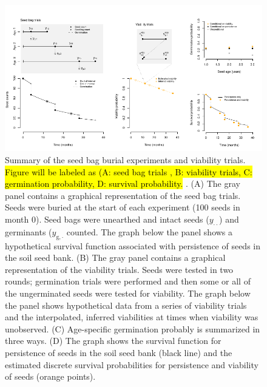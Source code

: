 \documentclass[12pt, oneside, titlepage]{article}   	%
\begin{document}
 \begin{figure}[!h]
   \centering
       \includegraphics[page=1,width=1\textwidth]{../../manuscript/figures/seed-bag-figure.pdf}  
    \caption{ Summary of the seed bag burial experiments and viability trials. \hl{Figure will be labeled as (A: seed bag trials , B: viability trials, C: germination probability, D: survival probability. }. (A) The gray panel contains a graphical representation of the seed bag trials. Seeds were buried at the start of each experiment (100 seeds in month 0). Seed bags were unearthed and intact seeds ($y_{\cdot \cdot}$) and germinants ($y_{\mathrm{g},\cdot}$ counted. The graph below the panel shows a hypothetical survival function associated with persistence of seeds in the soil seed bank. (B) The gray panel contains a graphical representation of the viability trials. Seeds were tested in two rounds; germination trials were performed and then some or all of the ungerminated seeds were tested for viability. The graph below the panel shows hypothetical data from a series of viability trials and the interpolated, inferred viabilities at times when viability was unobserved. (C) Age-specific germination probably is summarized in three ways. (D) The graph shows the survival function for persistence of seeds in the soil seed bank (black line) and the estimated discrete survival probabilities for persistence and viability of seeds (orange points). }
 \label{fig:seed-bag-experiments}
\end{figure}


\iffalse
\end{document}
